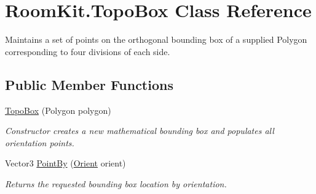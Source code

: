 \hypertarget{class_room_kit_1_1_topo_box}{}\section{Room\+Kit.\+Topo\+Box Class Reference}
\label{class_room_kit_1_1_topo_box}


Maintains a set of points on the orthogonal bounding box of a supplied Polygon corresponding to four divisions of each side.  


\subsection*{Public Member Functions}
\begin{DoxyCompactItemize}
\item 
\mbox{\hyperlink{class_room_kit_1_1_topo_box_aaf2418c0258d9c87c1d1ad66a6426169}{Topo\+Box}} (Polygon polygon)
\begin{DoxyCompactList}\small\item\em Constructor creates a new mathematical bounding box and populates all orientation points. \end{DoxyCompactList}\item 
Vector3 \mbox{\hyperlink{class_room_kit_1_1_topo_box_a48b838c48267cf92b3511c51c12339ce}{Point\+By}} (\mbox{\hyperlink{namespace_room_kit_a46927f752f7751de2c23e9e644fb508d}{Orient}} orient)
\begin{DoxyCompactList}\small\item\em Returns the requested bounding box location by orientation. \end{DoxyCompactList}\end{DoxyCompactItemize}
